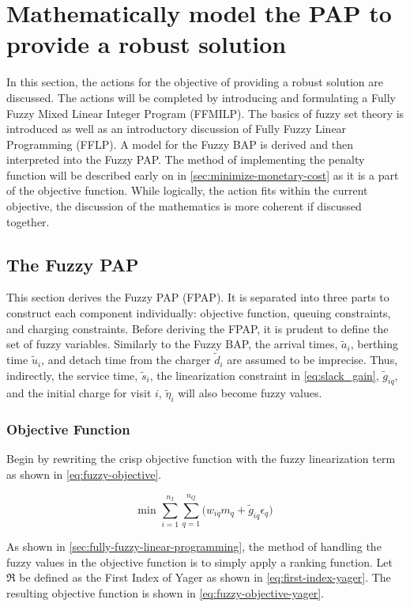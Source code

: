 \documentclass[ee,msthesis]{usuthesis}
\begin{document}
\section{Mathematically model the PAP to provide a robust solution}
\label{sec:math-model-robust}
In this section, the actions for the objective of providing a robust solution are discussed. The actions will be
completed by introducing and formulating a Fully Fuzzy Mixed Linear Integer Program (FFMILP). The basics of fuzzy set
theory is introduced as well as an introductory discussion of Fully Fuzzy Linear Programming (FFLP). A model for the
Fuzzy BAP is derived and then interpreted into the Fuzzy PAP. The method of implementing the penalty function will be
described early on in \ref{sec:minimize-monetary-cost} as it is a part of the objective function. While logically, the action
fits within the current objective, the discussion of the mathematics is more coherent if discussed together.

\subsection{The Fuzzy PAP}
\label{sec:the-fuzzy-pap}
This section derives the Fuzzy PAP (FPAP). It is separated into three parts to construct each component individually:
objective function, queuing constraints, and charging constraints. Before deriving the FPAP, it is prudent to define the
set of fuzzy variables. Similarly to the Fuzzy BAP, the arrival times, \(\tilde{a}_i\), berthing time \(\tilde{u}_i\), and
detach time from the charger \(\tilde{d}_i\) are assumed to be imprecise. Thus, indirectly, the service time,
\(\tilde{s}_i\), the linearization constraint in \ref{eq:slack_gain}, \(\tilde{g}_{iq}\), and the initial charge for visit
\(i\), \(\tilde{\eta}_i\) will also become fuzzy values.

\subsubsection{Objective Function}
\label{sec:orgea2cbf6}
Begin by rewriting the crisp objective function with the fuzzy linearization term as shown in \ref{eq:fuzzy-objective}.

\begin{equation}
\label{eq:fuzzy-objective}
\text{min } \sum_{i=1}^{n_I} \sum_{q=1}^{n_Q} \Big( w_{iq} m_q + \tilde{g}_{iq} \epsilon_{q} \Big)
\end{equation}

As shown in \ref{sec:fully-fuzzy-linear-programming}, the method of handling the fuzzy values in the objective function is to
simply apply a ranking function. Let \(\mathfrak{R}\) be defined as the First Index of Yager as shown in \ref{eq:first-index-yager}.
The resulting objective function is shown in \ref{eq:fuzzy-objective-yager}.
\end{document}
